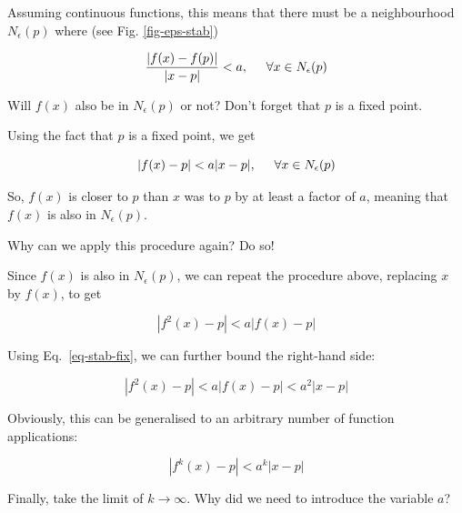 Assuming continuous functions, this means that there must be a neighbourhood $N_\epsilon(p)$ where (see Fig. \ref{fig-eps-stab})

\begin{equation}
\frac{\left|f(x)-f(p)\right|}{|x-p|} < a, \hspace{.5cm} \forall x \in N_\epsilon(p)
\end{equation}

\begin{cue}
Will $f(x)$ also be in $N_\epsilon(p)$ or not? Don't forget that $p$ is a fixed point. 
\end{cue}

Using the fact that $p$ is a fixed point, we get

\begin{equation}
\left|f(x)-p\right| < a |x-p|,  \hspace{.5cm} \forall x \in N_\epsilon(p) \label{eq-stab-fix}
\end{equation}

So, $f(x)$ is closer to $p$ than $x$ was to $p$ by at least a factor of $a$, meaning that $f(x)$ is also in $N_\epsilon(p)$.


\begin{cue}
Why can we apply this procedure again? Do so!  
\end{cue}

Since $f(x)$ is also in $N_\epsilon(p)$, we can repeat the procedure above, replacing $x$ by $f(x)$, to get

\begin{equation}
    \left|f^2(x)-p\right| < a\left|f(x)-p\right| 
\end{equation}  

Using Eq.~\ref{eq-stab-fix}, we can further bound the right-hand side:

\begin{equation}
    \left|f^2(x)-p\right| < a\left|f(x)-p\right| < a^2\left|x-p\right|
\end{equation}  

Obviously, this can be generalised to an arbitrary number of function applications:

\begin{equation}
\left|f^k(x)-p\right| < a^k |x-p| 
\end{equation}  

\begin{cue}
Finally, take the limit of $k \to \infty$. Why did we need to introduce the variable $a$?
\end{cue}

